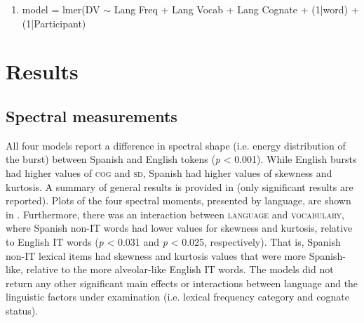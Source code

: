 \documentclass[output=paper,colorlinks,citecolor=brown,
]{langscibook}
\begin{document}
\begin{enumerate}
    \item\label{ex:gutierrez:stats_model} model = lmer(DV $\sim$ Lang \textasteriskcentered{} Freq + Lang \textasteriskcentered{} Vocab + Lang \textasteriskcentered{} Cognate + (1|word) + (1|Participant)
\end{enumerate}

\section{Results}\label{sec:gutierrez:results}

\subsection{Spectral measurements}

All four models report a difference in spectral shape (i.e. energy distribution of the burst) between Spanish and English tokens (\textit{p} \textless{} 0.001). While English bursts had higher values of \textsc{cog} and \textsc{sd}, Spanish had higher values of skewness and kurtosis. A summary of general results is provided in  (only significant results are reported).  Plots of the four spectral moments, presented by language, are shown in . Furthermore, there was an interaction between \textsc{language} and \textsc{vocabulary}, where Spanish non-IT words had lower values for skewness and kurtosis, relative to English IT words (\textit{p} \textless{} 0.031 and \textit{p} \textless{} 0.025, respectively). That is, Spanish non-IT lexical items had skewness and kurtosis values that were more Spanish-like, relative to the more alveolar-like English IT words. The models did not return any other significant main effects or interactions between language and the linguistic factors under examination (i.e. lexical frequency category and cognate status).
\end{document}
